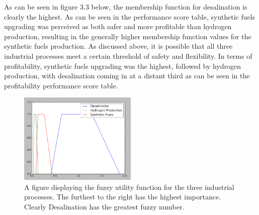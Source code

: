 \documentclass[12pt]{UIdahoMastersThesis}
\begin{document}
As can be seen in figure 3.3 below, the membership function for desalination is clearly the highest.  As can be seen in the performance score table, synthetic fuels upgrading was perceived as both safer and more profitable than hydrogen production, resulting in the generally higher membership function values for the synthetic fuels production. As discussed above, it is possible that all three industrial processes meet a certain threshold of safety and flexibility. In terms of profitability, synthetic fuels upgrading was the highest, followed by hydrogen production, with desalination coming in at a distant third as can be seen in the profitability performance score table. 

\begin{figure}[h!]
  \caption{A figure displaying the fuzzy utility function for the three industrial processes.  The furthest to the right has the highest importance. Clearly Desalination has the greatest fuzzy number.}
  \centering
  \includegraphics[width=0.5\textwidth]{membership.PNG}
\end{figure}
\end{document}
